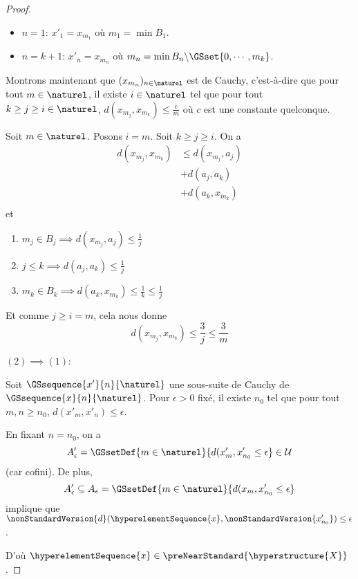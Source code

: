 \begin{proof}
	\begin{itemize}
		\item $n = 1$: $x'_{1} = x_{m_{1}}$ où $m_{1} = \min B_{1}$.
		\item $n = k + 1$: $x'_{n} = x_{m_{n}}$ où $m_{n} = \min B_{n}
			\backslash
			\GSset{0, \cdots, m_{k}}$.
	\end{itemize}

	Montrons maintenant que $(x_{m_{n}})_{n \in \naturel}$ est de Cauchy,
	c'est-à-dire que pour tout $m \in \naturel$, il existe $i \in \naturel$
	tel que pour tout $k \geq j \geq i \in \naturel$, $d(x_{m_{j}},
	x_{m_{k}}) \leq \frac{c}{m}$ où $c$ est une constante quelconque.

	Soit $m \in \naturel$. Posons $i = m$. Soit $k \geq j \geq
	i$. On a
	\begin{align}
		d(x_{m_{j}}, x_{m_{k}}) & \leq d(x_{m_{j}}, a_{j}) \\
		& + d(a_{j}, a_{k}) \\
		& + d(a_{k}, x_{m_{k}}) \\
	\end{align}
	et
	\begin{enumerate}
		\item $m_{j} \in B_{j} \implies d(x_{m_{j}}, a_{j}) \leq \frac{1}{j}$
		\item $j \leq k \implies d(a_{j}, a_{k}) \leq \frac{1}{j}$
		\item $m_{k} \in B_{k} \implies d(a_{k}, x_{m_{k}}) \leq \frac{1}{k}
			\leq \frac{1}{j}$
	\end{enumerate}

	Et comme $j \geq i = m$, cela nous donne
	\begin{equation}
		d(x_{m_{j}}, x_{m_{k}}) \leq \frac{3}{j} \leq \frac{3}{m}
	\end{equation}

	$(2) \implies (1)$:

	Soit $\GSsequence{x'}{n}{\naturel}$ une sous-suite de Cauchy de
	$\GSsequence{x}{n}{\naturel}$. Pour $\epsilon
	> 0$ fixé, il existe $n_{0}$ tel que pour tout $m, n \geq n_{0}$, $d(x'_{m},
	x'_{n}) \leq \epsilon$.

	En fixant $n = n_{0}$, on a
	\begin{equation}
		A'_{\epsilon} = \GSsetDef{m \in \naturel}{d(x'_{m}, x'_{n_{0}} \leq \epsilon} \in
		\mathcal{U}
	\end{equation}
	(car cofini). De plus,
	\begin{equation}
		A'_{\epsilon} \subseteq A_{\epsilon} = \GSsetDef{m \in
		\naturel}{d(x_{m}, x'_{n_{0}} \leq \epsilon}
	\end{equation}
	implique que $\nonStandardVersion{d}(\hyperelementSequence{x},
	\nonStandardVersion{x'_{n_{0}}}) \leq \epsilon$.

	D'où $\hyperelementSequence{x} \in \preNearStandard{\hyperstructure{X}}$.
\end{proof}
\fi

